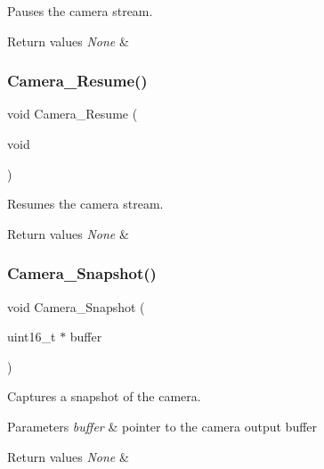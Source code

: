 Pauses the camera stream. 


\begin{DoxyRetVals}{Return values}
{\em None} & \\
\hline
\end{DoxyRetVals}
\mbox{\label{group___c_a_m_e_r_a___m_o_d_u_l_e___functions_gab3250105511ee890c3047100eea0c3e7}} 
\subsubsection{\texorpdfstring{Camera\+\_\+\+Resume()}{Camera\_Resume()}}
{\footnotesize\ttfamily void Camera\+\_\+\+Resume (\begin{DoxyParamCaption}\item[{void}]{ }\end{DoxyParamCaption})}



Resumes the camera stream. 


\begin{DoxyRetVals}{Return values}
{\em None} & \\
\hline
\end{DoxyRetVals}
\mbox{\label{group___c_a_m_e_r_a___m_o_d_u_l_e___functions_gaad66df57dbd5546f0a8dbe4a4d88fcf6}} 
\subsubsection{\texorpdfstring{Camera\+\_\+\+Snapshot()}{Camera\_Snapshot()}}
{\footnotesize\ttfamily void Camera\+\_\+\+Snapshot (\begin{DoxyParamCaption}\item[{uint16\+\_\+t $\ast$}]{buffer }\end{DoxyParamCaption})}



Captures a snapshot of the camera. 


\begin{DoxyParams}{Parameters}
{\em buffer} & pointer to the camera output buffer \\
\hline
\end{DoxyParams}

\begin{DoxyRetVals}{Return values}
{\em None} & \\
\hline
\end{DoxyRetVals}
